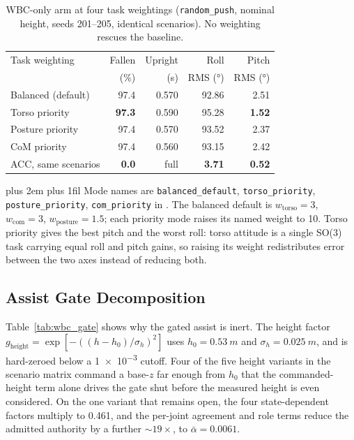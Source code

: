 \documentclass[a4paper,fleqn]{cas-dc}
\newcommand{\tabnote}{\par\leftskip=0pt\rightskip=0pt plus 2em%
  \parfillskip=0pt plus 1fil\relax}
\begin{document}
\begin{table}[pos=!htbp]
\centering
\caption{WBC-only arm at four task weightings (\texttt{random\_push}, nominal height, seeds 201--205, identical scenarios). No weighting rescues the baseline.}
\label{tab:wbc_taskweight}
\footnotesize
\setlength{\tabcolsep}{4pt}
\begin{tabular}{@{}>{\raggedright\arraybackslash}p{}rrrr@{}}
\toprule
Task weighting & Fallen & Upright & Roll & Pitch \\
               & (\si{\percent}) & (s) & RMS (\si{\degree}) & RMS (\si{\degree}) \\
\midrule
Balanced (default) & 97.4 & 0.570 & 92.86 & 2.51 \\
Torso priority     & \textbf{97.3} & 0.590 & 95.28 & \textbf{1.52} \\
Posture priority   & 97.4 & 0.570 & 93.52 & 2.37 \\
CoM priority       & 97.4 & 0.560 & 93.15 & 2.42 \\
\addlinespace
ACC, same scenarios & \textbf{0.0} & full & \textbf{3.71} & \textbf{0.52} \\
\bottomrule
\end{tabular}
\vspace{4pt}\tabnote\noindent\footnotesize
Mode names are \texttt{balanced\_default}, \texttt{torso\_priority}, \texttt{posture\_priority}, \texttt{com\_priority} in .
The balanced default is $w_{\text{torso}}{=}3$, $w_{\text{com}}{=}3$, $w_{\text{posture}}{=}1.5$; each priority mode raises its named weight to \num{10}.
Torso priority gives the best pitch and the worst roll: torso attitude is a single SO(3) task carrying equal roll and pitch gains, so raising its weight redistributes error between the two axes instead of reducing both.
\end{table}

\subsection{Assist Gate Decomposition}

Table~\ref{tab:wbc_gate} shows why the gated assist is inert.
The height factor $g_{\text{height}} = \exp[-((h-h_0)/\sigma_h)^2]$ uses
$h_0{=}\SI{0.53}{m}$ and $\sigma_h{=}\SI{0.025}{m}$, and is hard-zeroed below a
\num{1e-3} cutoff. Four of the five height variants in the scenario matrix
command a base-$z$ far enough from $h_0$ that the commanded-height term alone
drives the gate shut before the measured height is even considered.
On the one variant that remains open, the four state-dependent factors multiply
to \num{0.461}, and the per-joint agreement and role terms reduce the admitted
authority by a further ${\sim}\num{19}\times$, to $\bar\alpha{=}\num{0.0061}$.
\end{document}
